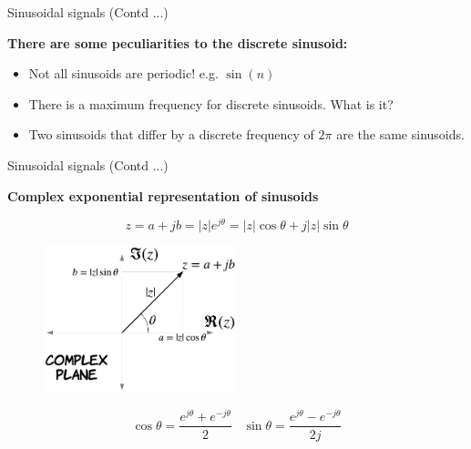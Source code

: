 \documentclass[aspectratio=169]{beamer}
\let\olditem\item
\renewcommand{\item}{\setlength{\itemsep}{\fill}\olditem}
\begin{document}
\begin{frame}[t]
\end{frame}


\begin{frame}[t]
\end{frame}


\begin{frame}{Sinusoidal signals (Contd ...)}

\textbf{There are some peculiarities to the discrete sinusoid:}
\begin{itemize}
\item Not all sinusoids are periodic! e.g. $\sin(n)$
\item There is a maximum frequency for discrete sinusoids. What is it?
\item Two sinusoids that differ by a discrete frequency of $2\pi$ are the same sinusoids.
\end{itemize}

\end{frame}

\begin{frame}{Sinusoidal signals (Contd ...)}\

\textbf{Complex exponential representation of sinusoids}

\[ z = a + jb = \left|z\right|e^{j\theta} = \left|z\right|\cos \theta + j \left|z\right|\sin \theta\]

\begin{figure}
\includegraphics[width=0.5\textwidth]{img/complex_plane.png}
\end{figure}

\[ \cos \theta = \frac{e^{j\theta} + e^{-j\theta}}{2} \,\,\,\,\, \sin \theta = \frac{e^{j\theta} - e^{-j\theta}}{2j}\]

\end{frame}


\begin{frame}[t]
\end{frame}
\end{document}
